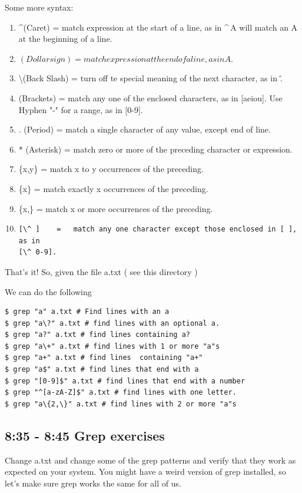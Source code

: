 \documentclass[10pt]{article}
\begin{document}
Some more syntax:
\begin{enumerate}
\item \textasciicircum (Caret)   =   match expression at the start of a line, as
in \textasciicircum\,A will match an A at the beginning of a line.
\item $ (Dollar sign)    =   match expression at the end of a line, as in A$.
\item \textbackslash (Back Slash)  =   turn off te special meaning of the next character, as in \^.
\item [ ] (Brackets)  =   match any one of the enclosed characters, as in [aeiou]. Use Hyphen "-" for a range, as in [0-9].
\item . (Period)  =   match a single character of any value, except end of line.
\item * (Asterisk)    =   match zero or more of the preceding character or expression.
\item \{x,y\} =   match x to y occurrences of the preceding.
\item \{x\}   =   match exactly x occurrences of the preceding.
\item  \{x,\}  =   match x or more occurrences of the preceding.
\item \begin{verbatim}[\^ ]    =   match any one character except those enclosed in [ ], as in
[\^ 0-9].\end{verbatim}
\end{enumerate}

That's it! So, given the file a.txt ( see this directory )

We can do the following

\begin{lstlisting}[style=term]
$ grep "a" a.txt # Find lines with an a
$ grep "a\?" a.txt # find lines with an optional a.
$ grep "a?" a.txt # find lines containing a?
$ grep "a\+" a.txt # find lines with 1 or more "a"s
$ grep "a+" a.txt # find lines  containing "a+" 
$ grep "a$" a.txt # find lines that end with a
$ grep "[0-9]$" a.txt # find lines that end with a number
$ grep "^[a-zA-Z]$" a.txt # find lines with one letter.
$ grep "a\{2,\}" a.txt # find lines with 2 or more "a"s
\end{lstlisting}


\subsection{ 8:35 - 8:45 Grep exercises } 
Change a.txt and change some of the grep patterns and verify that they work as expected on your system. You might have a weird version of grep installed, so let's make sure grep works the same for all of us.
\end{document}
